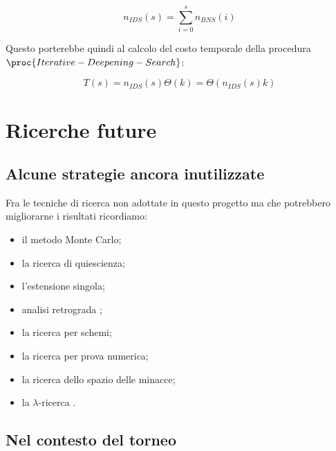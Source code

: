 \documentclass{article}
\begin{document}
\begin{equation}
  n_{IDS}(s) = \sum_{i = 0}^{s} n_{BNS}(i)
\end{equation}

Questo porterebbe quindi al calcolo del costo temporale della procedura
$\proc{Iterative-Deepening-Search}$:

\begin{equation}
  T(s) = n_{IDS}(s) \Theta(k) = \Theta(n_{IDS}(s) k)
\end{equation}

\section{Ricerche future}

\subsection{Alcune strategie ancora inutilizzate}

Fra le tecniche di ricerca non adottate in questo progetto ma che potrebbero
migliorarne i risultati ricordiamo:
\begin{itemize}
    \item il metodo Monte Carlo;
    \item la ricerca di quiescienza;
    \item l'estensione singola;
    \item analisi retrograda \cite{at.UBO029034619980101.207--211};
    \item la ricerca per schemi;
    \item la ricerca per prova numerica;
    \item la ricerca dello spazio delle minacce;
    \item la $\lambda$-ricerca \cite{VANDENHERIK2002277}.
\end{itemize}

\subsection{Nel contesto del torneo}
\end{document}
